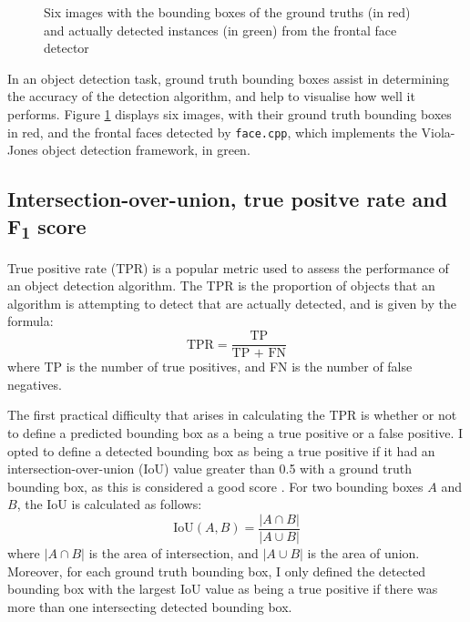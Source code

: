 \documentclass[twocolumn, 10pt, a4paper]{article}
\begin{document}
\begin{figure}[htbp]
  \hfill
  \hfill
  \caption{Six images with the bounding boxes of the ground truths (in red) and actually detected instances (in green) from the frontal face detector}\label{fig:face}
\end{figure}

In an object detection task, ground truth bounding boxes assist in determining the accuracy of the detection algorithm, and help to visualise how well it performs.
Figure \ref{fig:face} displays six images, with their ground truth bounding boxes in red, and the frontal faces detected by \texttt{face.cpp}, which implements the Viola-Jones object detection framework, in green.

\subsection{Intersection-over-union, true positve rate and F\textsubscript{1} score}

True positive rate (TPR) is a popular metric used to assess the performance of an object detection algorithm.
The TPR is the proportion of objects that an algorithm is attempting to detect that are actually detected, and is given by the formula:
\[
  \textrm{TPR} = \frac{\textrm{TP}}{\textrm{TP + FN}}
\]
where TP is the number of true positives, and FN is the number of false negatives.

The first practical difficulty that arises in calculating the TPR is whether or not to define a predicted bounding box as a being a true positive or a false positive.
I opted to define a detected bounding box as being a true positive if it had an intersection-over-union (IoU) value greater than 0.5 with a ground truth bounding box, as this is considered a good score \cite{iou}.
For two bounding boxes $A$ and $B$, the IoU is calculated as follows:
\[
  \textrm{IoU}(A, B) = \frac{|A \cap B|}{|A \cup B|}
\]
where $|A \cap B|$ is the area of intersection, and $|A \cup B|$ is the area of union.
Moreover, for each ground truth bounding box, I only defined the detected bounding box with the largest IoU value as being a true positive if there was more than one intersecting detected bounding box.
\end{document}
